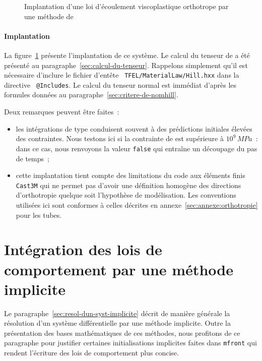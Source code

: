 \documentclass[rectoverso,pleiades,pstricks,leqno,anti]{texmf/note_technique_2010}
\newcommand{\mfront}{\texttt{mfront}}
\newcommand{\castem}{\texttt{Cast3M}}
\newcommand{\code}[1]{
  \psframebox[linecolor=ceaorange,shadow=true,blur=true]{
    \begin{minipage}[htbp]{1.0\linewidth}
      \ttfamily\scriptsize #1
    \end{minipage}
  }
}
\begin{document}
\begin{figure}[htbp]
  \centering
  \begin{minipage}[htbp]{0.9\linewidth}
    \shorthandoff{:}
    \code{
      \small
      
    }
    \shorthandon{:}
  \end{minipage}
  \caption{Implantation d'une loi d'écoulement viscoplastique
    orthotrope par une mé\-tho\-de de }
  \label{fig:OrthoViscoRK}
\end{figure}

\paragraph{Implantation} La figure~\ref{fig:OrthoViscoRK} présente
l'implantation de ce système. Le calcul du tenseur de  a été
présenté au paragraphe~\ref{sec:calcul-du-tenseur}. Rappelons
simplement qu'il est nécessaire d'inclure le fichier d'entête {\tt
  TFEL/\-Material\-Law/\-Hill.hxx} dans la directive {\tt
  @Includes}. Le calcul du tenseur normal est immédiat d'après les
formules données au paragraphe~\ref{sec:critere-de-nomhill}.

Deux remarques peuvent être faites~:
\begin{itemize}
  \item les intégrations de type  conduisent souvent à
  des prédictions initiales élevées des contraintes. Nous testons ici si
  la contrainte de  est supérieure à \(10^{9}\, MPa\)~: dans
  ce cas, nous renvoyons la valeur {\tt false} qui entraîne un découpage
  du pas de temps~;
  \item cette implantation tient compte des limitations du code aux
  éléments finis \castem{} qui ne permet pas d'avoir une définition
  homogène des directions d'orthotropie quelque soit l'hypothèse de
  modélisation. Les conventions utilisées ici sont conformes à celles
  décrites en annexe~\ref{sec:annexe:orthotropie} pour les tubes.
\end{itemize}

\clearpage
\newpage
\section{Intégration des lois de comportement par une méthode implicite}
\label{sec:Implicite}

Le paragraphe~\ref{sec:resol-dun-syst-implicite} décrit de manière
générale la résolution d'un système différentielle par une méthode
implicite. Outre la présentation des bases mathématiques de ces
méthodes, nous profitons de ce paragraphe pour justifier certaines
initialisations implicites faites dans \mfront{} qui rendent l'écriture
des lois de comportement plus concise.
\end{document}
